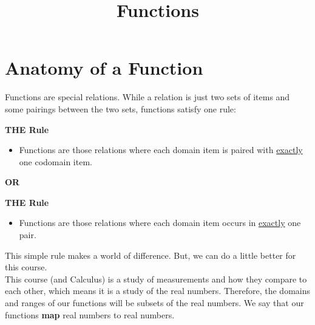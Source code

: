 \documentclass{ximera}
\title{Functions}
\begin{document}
\begin{abstract}
\end{abstract}
\maketitle





\section{Anatomy of a Function}


Functions are special relations. While a relation is just two sets of items and some pairings between the two sets, functions satisfy one rule: \\


\begin{condition} \textbf{\textcolor{purple!85!blue}{THE Rule}}  \\

\begin{itemize}
\item Functions are those relations where each domain item is paired with \underline{exactly} one codomain item.
\end{itemize}
\end{condition}


\begin{center}
\textbf{OR}
\end{center}


\begin{condition} \textbf{\textcolor{purple!85!blue}{THE Rule}} \\

\begin{itemize}
\item Functions are those relations where each domain item occurs in \underline{exactly} one pair.
\end{itemize}
\end{condition}




This simple rule makes a world of difference. But, we can do a little better for this course. \\




This course (and Calculus) is a study of measurements and how they compare to each other, which means it is a study of the real numbers.  Therefore, the domains and ranges of our functions will be subsets of the real numbers.  We say that our functions \textbf{map} real numbers to real numbers.
\end{document}
